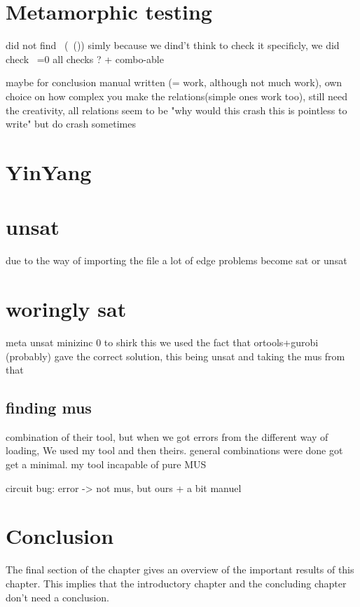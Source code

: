 \section{Metamorphic testing}
did not find ~(~()) simly because we dind't think to check it specificly, we did check ~=0
all checks ? + combo-able

maybe for conclusion
manual written (= work, although not much work), own choice on how complex you make the relations(simple ones work too), still need the creativity, all relations seem to be "why would this crash this is pointless to write" but do crash sometimes

\section{YinYang}


\section{unsat}
due to the way of importing the file a lot of edge problems become sat or unsat

\section{woringly sat}
meta unsat minizinc 0
to shirk this we used the fact that ortools+gurobi (probably) gave the correct solution, this being unsat and taking the mus from that


\subsection{finding mus}
combination of their tool, but when we got errors from the different way of loading, We used my tool and then theirs. general combinations were done got get a minimal. 
my tool incapable of pure MUS

circuit bug: error -> not mus, but ours + a bit manuel



\section{Conclusion}
The final section of the chapter gives an overview of the important results
of this chapter. This implies that the introductory chapter and the
concluding chapter don't need a conclusion.

